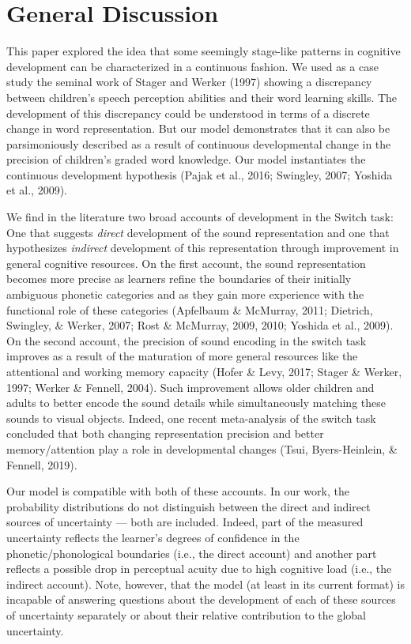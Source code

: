 \documentclass[english,,man]{apa6}
\theoremstyle{definition}
\theoremstyle{definition}
\theoremstyle{definition}
\theoremstyle{remark}
\begin{document}
\section{General Discussion}\label{general-discussion}

This paper explored the idea that some seemingly stage-like patterns in
cognitive development can be characterized in a continuous fashion. We
used as a case study the seminal work of Stager and Werker (1997)
showing a discrepancy between children's speech perception abilities and
their word learning skills. The development of this discrepancy could be
understood in terms of a discrete change in word representation. But our
model demonstrates that it can also be parsimoniously described as a
result of continuous developmental change in the precision of children's
graded word knowledge. Our model instantiates the continuous development
hypothesis (Pajak et al., 2016; Swingley, 2007; Yoshida et al., 2009).

We find in the literature two broad accounts of development in the
Switch task: One that suggests \emph{direct} development of the sound
representation and one that hypothesizes \emph{indirect} development of
this representation through improvement in general cognitive resources.
On the first account, the sound representation becomes more precise as
learners refine the boundaries of their initially ambiguous phonetic
categories and as they gain more experience with the functional role of
these categories (Apfelbaum \& McMurray, 2011; Dietrich, Swingley, \&
Werker, 2007; Rost \& McMurray, 2009, 2010; Yoshida et al., 2009). On
the second account, the precision of sound encoding in the switch task
improves as a result of the maturation of more general resources like
the attentional and working memory capacity (Hofer \& Levy, 2017; Stager
\& Werker, 1997; Werker \& Fennell, 2004). Such improvement allows older
children and adults to better encode the sound details while
simultaneously matching these sounds to visual objects. Indeed, one
recent meta-analysis of the switch task concluded that both changing
representation precision and better memory/attention play a role in
developmental changes (Tsui, Byers-Heinlein, \& Fennell, 2019).

Our model is compatible with both of these accounts. In our work, the
probability distributions do not distinguish between the direct and
indirect sources of uncertainty --- both are included. Indeed, part of
the measured uncertainty reflects the learner's degrees of confidence in
the phonetic/phonological boundaries (i.e., the direct account) and
another part reflects a possible drop in perceptual acuity due to high
cognitive load (i.e., the indirect account). Note, however, that the
model (at least in its current format) is incapable of answering
questions about the development of each of these sources of uncertainty
separately or about their relative contribution to the global
uncertainty.
\end{document}
